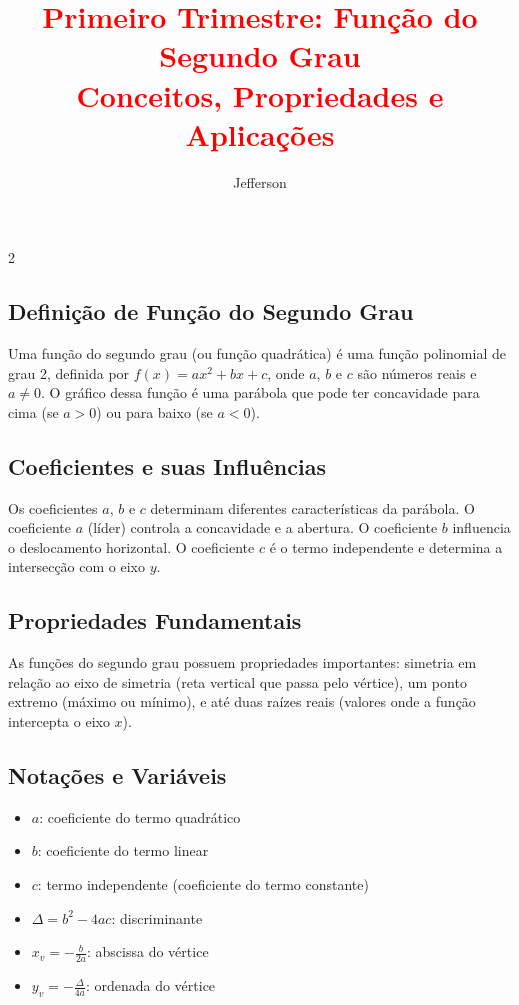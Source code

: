 \documentclass[11pt]{article}
\title{\textcolor{red}{Primeiro Trimestre: Função do Segundo Grau
    \\Conceitos, Propriedades e Aplicações}}
\author{Jefferson}
\date{}
\begin{document}
\maketitle
\vspace{-1cm}

\begin{multicols}{2}


\subsection*{Definição de Função do Segundo Grau}
Uma função do segundo grau (ou função quadrática) é uma função polinomial de grau 2, definida por $f(x) = ax^2 + bx + c$, onde $a$, $b$ e $c$ são números reais e $a \neq 0$. O gráfico dessa função é uma parábola que pode ter concavidade para cima (se $a > 0$) ou para baixo (se $a < 0$).

\subsection*{Coeficientes e suas Influências}
Os coeficientes $a$, $b$ e $c$ determinam diferentes características da parábola. O coeficiente $a$ (líder) controla a concavidade e a abertura. O coeficiente $b$ influencia o deslocamento horizontal. O coeficiente $c$ é o termo independente e determina a intersecção com o eixo $y$.

\subsection*{Propriedades Fundamentais}
As funções do segundo grau possuem propriedades importantes: simetria em relação ao eixo de simetria (reta vertical que passa pelo vértice), um ponto extremo (máximo ou mínimo), e até duas raízes reais (valores onde a função intercepta o eixo $x$).

\subsection*{Notações e Variáveis}
\begin{itemize}
\item $a$: coeficiente do termo quadrático
\item $b$: coeficiente do termo linear
\item $c$: termo independente (coeficiente do termo constante)
\item $\Delta = b^2 - 4ac$: discriminante
\item $x_v = -\frac{b}{2a}$: abscissa do vértice
\item $y_v = -\frac{\Delta}{4a}$: ordenada do vértice
\end{itemize}


\end{multicols}
\end{document}
